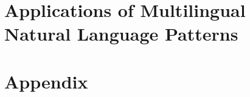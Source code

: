 \part{Applications of Multilingual Natural Language Patterns}
%
%
%
%
%
%
%
\appendix
\cleardoublepage
\part{Appendix}
%
\cleardoublepage
\cleardoublepage

